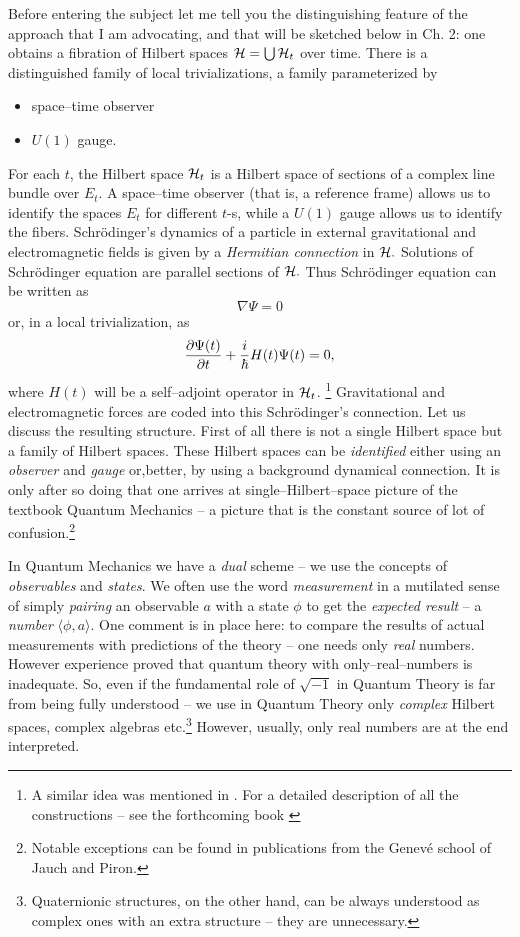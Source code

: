 \documentclass[12pt]{article}
\def\be{\begin{equation}} \def\ee{\end{equation}}
\begin{document}
Before entering the subject let me tell you the
distinguishing feature of the approach that I am advocating,  and that
will be sketched below in Ch. 
2:  one obtains a fibration of Hilbert spaces ${\cal H}=\bigcup {\cal H}
_t$ over time.  There is  a distinguished family of local
trivializations,  a family parameterized by 
\begin{itemize}
\item  space--time observer 
\item $U (1)$ gauge.
\end{itemize}
For each $t$, the Hilbert space ${\cal H}_t$ is a Hilbert space
of sections of a complex line bundle over $E_t$. A space--time observer
(that is, a reference frame)
allows us to identify the spaces $E_t$ for different $t$-s, while
a $U(1)$ gauge allows us to identify the fibers.
Schr\"odinger's dynamics of a particle in external gravitational and
electromagnetic
fields
is given by a {\em Hermitian connection} in ${\cal H}. $ Solutions of
Schr\"odinger
equation are parallel sections of ${\cal H}. $ Thus Schr\"odinger equation
can be written
as \be
\nabla \Psi = 0 \ee
or,  in a local trivialization,  as \be
{\frac{{\partial \Psi  (t)}}{{\partial t}}} + 
{i\over\hbar}H (t)\Psi  (t) =
0,  \ee
where $H (t)$ will be a self--adjoint operator in ${\cal H}_t$.%
\footnote{A similar idea was mentioned in \cite{aso}.  For a detailed
description of all the constructions -- see the forthcoming book \cite{jamo}}
Gravitational and electromagnetic forces are
coded into this Schr\"odinger's connection. 
Let us discuss the resulting structure.  First of all
there is not a single  Hilbert space but a
{family} of Hilbert spaces. 
These Hilbert spaces can be {\em identified} either using an
{\em observer}  and
{\em gauge}  or,better, by using a background dynamical connection.
It is only after so doing 
that one arrives at
single--Hilbert--space picture of the textbook Quantum Mechanics --
a picture that
is the constant source of lot of confusion.\footnote{Notable
exceptions can be found in  publications from the
Genev\'e school of Jauch and Piron. }
 
In Quantum Mechanics we have a {\em dual}
scheme -- we use the concepts of {\em observables} and {\em states}.  We often
use the word {\em measurement} in a mutilated sense of simply {\em pairing}
an observable $a$ with a state $\phi $ to get the {\em expected result} -- 
a {\em number} $
\langle\phi , a\rangle. $ 
\noindent
One comment is in place here:  to compare the results of actual
measurements with predictions of the theory -- one needs only {\em real}
numbers.  However experience proved that quantum theory with
only--real--numbers is inadequate.  So,  even if the fundamental role of
$\sqrt{-1}$ in Quantum Theory is far from being fully understood --
we use in Quantum Theory only {\em complex} Hilbert spaces,  complex algebras
etc.\footnote{Quaternionic  structures,  on the other hand,  can be always 
understood as complex
ones with an extra structure -- they are unnecessary.  } 
However,  usually,  only real numbers are at the end interpreted.  
 
\end{document}
